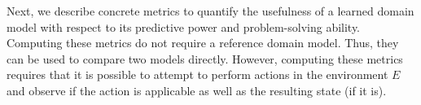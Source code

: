 \documentclass[letterpaper]{article} %
\newif\ifaddcomments
\newcommand{\roni}[1]{\ifaddcomments{\textcolor{red}{[Roni: #1]}}\fi}
\begin{document}
Next, we describe concrete metrics to quantify the usefulness of a learned domain model with respect to its predictive power and problem-solving ability. 
Computing these metrics do not require a reference domain model. Thus, they can be used to compare two models directly.
However, computing these metrics requires that it is possible to attempt to perform actions in the environment $E$ and observe if the action is applicable as well as the resulting state (if it is). %








\end{document}

